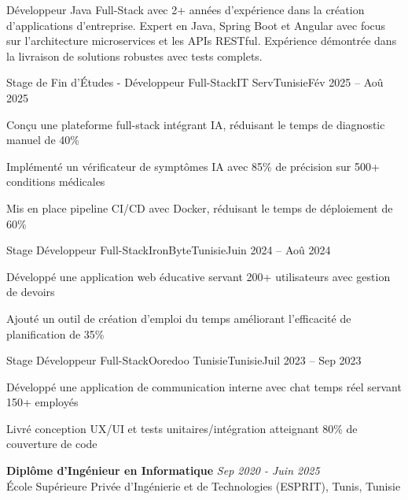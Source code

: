 \documentclass[11pt,a4paper]{article}
\begin{document}
\makecvheader
\makecontactinfo

Développeur Java Full-Stack avec 2+ années d'expérience dans la création d'applications d'entreprise. Expert en Java, Spring Boot et Angular avec focus sur l'architecture microservices et les APIs RESTful. Expérience démontrée dans la livraison de solutions robustes avec tests complets.


\begin{internship}{Stage de Fin d'Études - Développeur Full-Stack}{IT Serv}{Tunisie}{Fév 2025 -- Aoû 2025}{}
  \item Conçu une plateforme full-stack intégrant IA, réduisant le temps de diagnostic manuel de 40\%
  \item Implémenté un vérificateur de symptômes IA avec 85\% de précision sur 500+ conditions médicales
  \item Mis en place pipeline CI/CD avec Docker, réduisant le temps de déploiement de 60\%
\end{internship}

\begin{internship}{Stage Développeur Full-Stack}{IronByte}{Tunisie}{Juin 2024 -- Aoû 2024}{}
  \item Développé une application web éducative servant 200+ utilisateurs avec gestion de devoirs
  \item Ajouté un outil de création d'emploi du temps améliorant l'efficacité de planification de 35\%
\end{internship}

\begin{internship}{Stage Développeur Full-Stack}{Ooredoo Tunisie}{Tunisie}{Juil 2023 -- Sep 2023}{}
  \item Développé une application de communication interne avec chat temps réel servant 150+ employés
  \item Livré conception UX/UI et tests unitaires/intégration atteignant 80\% de couverture de code
\end{internship}

\textbf{Diplôme d'Ingénieur en Informatique} \hfill \textit{Sep 2020 - Juin 2025}\\[-2pt]
École Supérieure Privée d'Ingénierie et de Technologies (ESPRIT), Tunis, Tunisie
\end{document}
